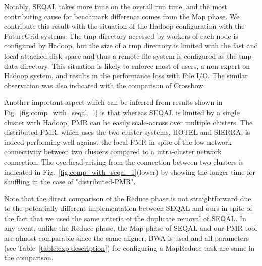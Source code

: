 \documentclass{sig-alternate}
\begin{document}
{Notably, SEQAL takes more time on the overall run time, and the most
contributing cause for benchmark difference comes from the Map phase.
We contribute this result with the situation of the Hadoop
configuration with the FutureGrid systems.  The tmp directory accessed
by workers of each node is configured by Hadoop, but the size of a tmp
directory is limited with the fast and local attached disk space and
thus a remote file system is configured as the tmp data directory.
This situation is likely to enforce most of users, a non-expert on
Hadoop system, and results in the performance loss with File I/O.  The
similar observation was also indicated with the comparison of
Crossbow.

Another important aspect which can be inferred from results shown in
Fig.~\ref{fig:comp_with_seqal_1} is that whereas SEQAL is limited by a
single cluster with Hadoop, PMR can be easily scale-across over
multiple clusters. The distributed-PMR, which uses the two cluster
systems, HOTEL and SIERRA, is indeed performing well against the
local-PMR in spite of the low network connectivity between two
clusters compared to a intra-cluster network connection.  The overhead
arising from the connection between two clusters is indicated in
Fig.~\ref{fig:comp_with_seqal_1}(lower) by showing the longer time for
shuffling in the case of "distributed-PMR".

Note that the direct comparison of the Reduce phase is not straightforward due to the potentially different implementation between SEQAL and ours in spite of the fact that we used the same criteria of the duplicate removal of SEQAL\cite{seal_2011_mapred}.  In any event, unlike the Reduce phase, the Map phase of SEQAL and our PMR tool are almost comparable since the same aligner, BWA is used and all parameters (see Table~\ref{table:exp-description}) for configuring a MapReduce task are same in the comparison.   



}
\end{document}
